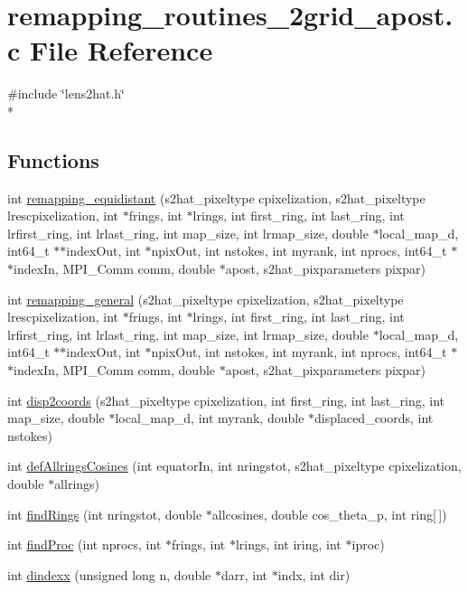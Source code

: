 \section{remapping\-\_\-routines\-\_\-2grid\-\_\-apost.\-c File Reference}
\label{remapping__routines__2grid__apost_8c}
{\ttfamily \#include \char`\"{}lens2hat.\-h\char`\"{}}\\*
\subsection*{Functions}
\begin{DoxyCompactItemize}
\item 
int \hyperlink{remapping__routines__2grid__apost_8c_ac206a2513bf4ab611372a51c9f2196e9}{remapping\-\_\-equidistant} (s2hat\-\_\-pixeltype cpixelization, s2hat\-\_\-pixeltype lrescpixelization, int $\ast$frings, int $\ast$lrings, int first\-\_\-ring, int last\-\_\-ring, int lrfirst\-\_\-ring, int lrlast\-\_\-ring, int map\-\_\-size, int lrmap\-\_\-size, double $\ast$local\-\_\-map\-\_\-d, int64\-\_\-t $\ast$$\ast$index\-Out, int $\ast$npix\-Out, int nstokes, int myrank, int nprocs, int64\-\_\-t $\ast$$\ast$index\-In, M\-P\-I\-\_\-\-Comm comm, double $\ast$apost, s2hat\-\_\-pixparameters pixpar)
\item 
int \hyperlink{remapping__routines__2grid__apost_8c_a7b466c0dfe4d4718622fa5220d7149a3}{remapping\-\_\-general} (s2hat\-\_\-pixeltype cpixelization, s2hat\-\_\-pixeltype lrescpixelization, int $\ast$frings, int $\ast$lrings, int first\-\_\-ring, int last\-\_\-ring, int lrfirst\-\_\-ring, int lrlast\-\_\-ring, int map\-\_\-size, int lrmap\-\_\-size, double $\ast$local\-\_\-map\-\_\-d, int64\-\_\-t $\ast$$\ast$index\-Out, int $\ast$npix\-Out, int nstokes, int myrank, int nprocs, int64\-\_\-t $\ast$$\ast$index\-In, M\-P\-I\-\_\-\-Comm comm, double $\ast$apost, s2hat\-\_\-pixparameters pixpar)
\item 
int \hyperlink{remapping__routines__2grid__apost_8c_a8224d455c626532938c1729f5e62daee}{disp2coords} (s2hat\-\_\-pixeltype cpixelization, int first\-\_\-ring, int last\-\_\-ring, int map\-\_\-size, double $\ast$local\-\_\-map\-\_\-d, int myrank, double $\ast$displaced\-\_\-coords, int nstokes)
\item 
int \hyperlink{remapping__routines__2grid__apost_8c_af6cfda4741a11339b5a1d9c599411b87}{def\-Allrings\-Cosines} (int equator\-In, int nringstot, s2hat\-\_\-pixeltype cpixelization, double $\ast$allrings)
\item 
int \hyperlink{remapping__routines__2grid__apost_8c_a95c082e86d6e644f4789485021f90235}{find\-Rings} (int nringstot, double $\ast$allcosines, double cos\-\_\-theta\-\_\-p, int ring\mbox{[}$\,$\mbox{]})
\item 
int \hyperlink{remapping__routines__2grid__apost_8c_af4ba917a5b9f32394911c8d28d6c2d07}{find\-Proc} (int nprocs, int $\ast$frings, int $\ast$lrings, int iring, int $\ast$iproc)
\item 
int \hyperlink{remapping__routines__2grid__apost_8c_ad574f0dfca1f8db2b630a9b6cf3a45c9}{dindexx} (unsigned long n, double $\ast$darr, int $\ast$indx, int dir)
\end{DoxyCompactItemize}
